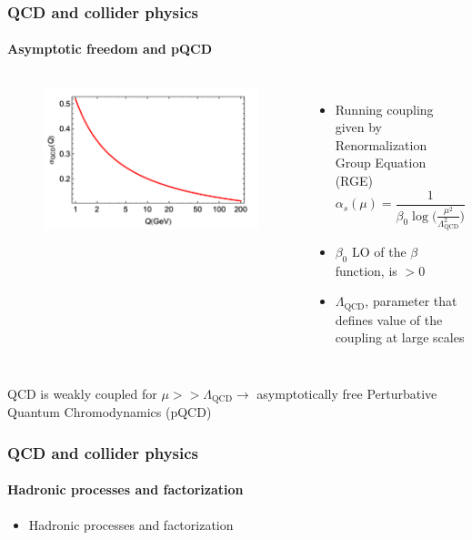 \documentclass[aspectratio=43]{beamer}
\begin{document}
\begin{frame}

	\frametitle{QCD and collider physics}
	\framesubtitle{Asymptotic freedom and pQCD}
	
	\begin{columns}	
		
		
		\begin{figure}
			\includegraphics[width = 5 cm]{plots/part1/chapter1/qcd_running_coupling.png}
		\end{figure}
		
		
		\begin{itemize}
			\item \footnotesize Running coupling given by Renormalization Group Equation (RGE)
			\begin{equation}
			\alpha_{s}(\mu) = \frac{1}{\beta_{0} \log\big( \frac{\mu^{2}}{\Lambda_{\textrm{QCD}}^{2}}\big)} \nonumber
			\end{equation}
			\item \footnotesize $\beta_{0}$ LO of the $\beta$ function, is $ > 0$
			\item \footnotesize $\Lambda_{\textrm{QCD}}$, parameter that defines value of the coupling at large scales
		\end{itemize}
		
	\end{columns}
	
	\vspace{1cm}
	\center \footnotesize QCD is weakly coupled for $\mu >> \Lambda_{\textrm{QCD}} \longrightarrow$ asymptotically free
	\center \footnotesize \color{red} Perturbative Quantum Chromodynamics (pQCD)

\end{frame}

\begin{frame}
	
	\frametitle{QCD and collider physics}
	\framesubtitle{Hadronic processes and factorization}
	
	\begin{itemize}
		\item \footnotesize Hadronic processes and factorization
	\end{itemize}

\end{frame}
\end{document}
